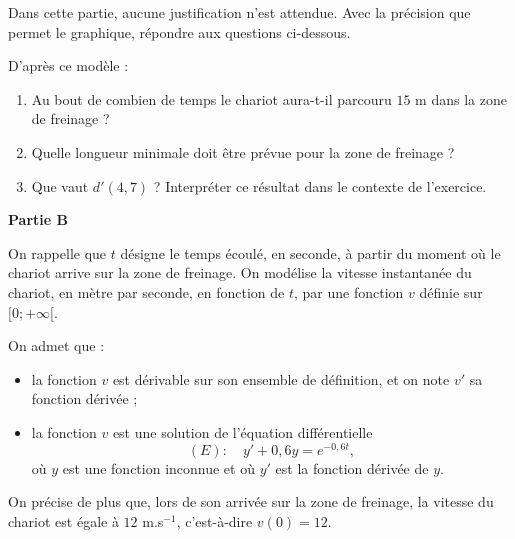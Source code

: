 \documentclass[11pt,a4paper]{article}
\newcounter{question}
\begin{document}
Dans cette partie, aucune justification n'est attendue. Avec la précision que permet le graphique, répondre aux questions ci-dessous.

D'après ce modèle :
\begin{enumerate}
  \item Au bout de combien de temps le chariot aura-t-il parcouru $15$ m dans la zone de freinage ?
  \item Quelle longueur minimale doit être prévue pour la zone de freinage ?
  \item Que vaut $d'(4{,}7)$ ? Interpréter ce résultat dans le contexte de l'exercice.
\end{enumerate}

\textbf{Partie B}

On rappelle que $t$ désigne le temps écoulé, en seconde, à partir du moment où le chariot arrive sur la zone de freinage.
On modélise la vitesse instantanée du chariot, en mètre par seconde, en fonction de $t$, par une fonction $v$ définie sur $[0;+\infty[$.

On admet que :
\begin{itemize}
  \item la fonction $v$ est dérivable sur son ensemble de définition, et on note $v'$ sa fonction dérivée ;
  \item la fonction $v$ est une solution de l'équation différentielle
  \[
  (E):\quad y'+0{,}6y=e^{-0{,}6t},
  \]
  où $y$ est une fonction inconnue et où $y'$ est la fonction dérivée de $y$.
\end{itemize}
On précise de plus que, lors de son arrivée sur la zone de freinage, la vitesse du chariot est égale à $12$ m.s$^{-1}$, c'est-à-dire $v(0)=12$.
\end{document}
